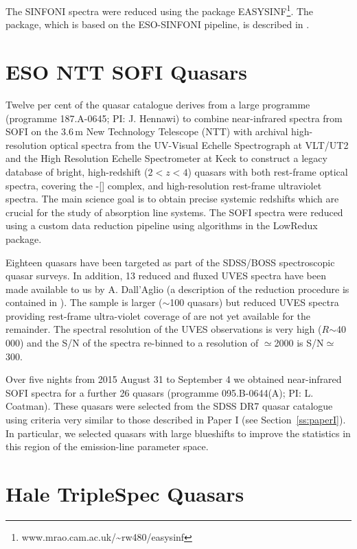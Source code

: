 The SINFONI spectra were reduced using the package EASYSINF\footnote{www.mrao.cam.ac.uk/\textasciitilde rw480/easysinf}.  
The package, which is based on the ESO-SINFONI pipeline, is described in \citet{williams16}. 

\section{ESO NTT SOFI Quasars}

Twelve per cent of the quasar catalogue derives from a large programme (programme 187.A-0645; PI: J. Hennawi) to combine near-infrared spectra from SOFI \citep{moorwood98a} on the 3.6\,m New Technology Telescope (NTT) with archival high-resolution optical spectra from the UV-Visual Echelle Spectrograph \citep[UVES;][]{dekker00} at VLT/UT2 and the High Resolution Echelle Spectrometer \citep[HIRES;][]{vogt94} at Keck to construct a legacy database of bright, high-redshift ($2 < z < 4$) quasars with both rest-frame optical spectra, covering the \hbns-[] complex, and high-resolution rest-frame ultraviolet spectra.
The main science goal is to obtain precise systemic redshifts which are crucial for the study of absorption line systems.  
The SOFI spectra were reduced using a custom data reduction pipeline using algorithms in the LowRedux package.

Eighteen quasars have been targeted as part of the SDSS/BOSS spectroscopic quasar surveys.
In addition, 13 reduced and fluxed UVES spectra have been made available to us by A. Dall'Aglio (a description of the reduction procedure is contained in \citet{dallaglio08}).
The sample is larger ($\sim$100 quasars) but reduced UVES spectra providing rest-frame ultra-violet coverage of  are not yet available for the remainder. 
The spectral resolution of the UVES observations is very high ($R$$\sim$40\,000) and the S/N of the spectra re-binned to a resolution of $\simeq$2000 is S/N$\simeq$300. 

Over five nights from 2015 August 31 to September 4 we obtained near-infrared SOFI spectra for a further 26 quasars (programme 095.B-0644(A); PI: L. Coatman). 
These quasars were selected from the SDSS DR7 quasar catalogue using criteria very similar to those described in Paper I (see Section~\ref{ss:paperI}). 
In particular, we selected quasars with large  blueshifts to improve the statistics in this region of the  emission-line parameter space. 

\section{Hale TripleSpec Quasars}

